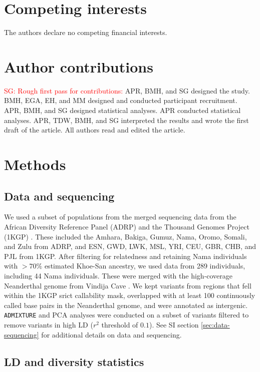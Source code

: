 \documentclass[]{article}
\newcommand{\sgcomment}[1]{{\textcolor{red}{SG: #1}}}
\begin{document}
\section*{Competing interests}
The authors declare no competing financial interests.

\section*{Author contributions}

\sgcomment{Rough first pass for contributions:}
APR, BMH, and SG designed the study. BMH, EGA, EH, and MM designed and conducted 
participant recruitment.   APR, BMH, and SG designed statistical analyses.
APR conducted statistical analyses. 
APR, TDW, BMH, and SG interpreted the results and wrote the first draft of the article. 
All authors read and edited the article.  

\section*{Methods}

\subsection*{Data and sequencing}

We used a subset of populations from the merged sequencing data from the
African Diversity Reference Panel (ADRP) \citep{Gurdasani2015-qy,Pagani2015-pz}
and the Thousand Genomes Project (1KGP)
\citep{1000_Genomes_Project_Consortium2015-zq}. These included the Amhara,
Bakiga, Gumuz, Nama, Oromo, Somali, and Zulu from ADRP, and ESN, GWD, LWK, MSL,
YRI, CEU, GBR, CHB, and PJL from 1KGP. After filtering for relatedness and
retaining Nama individuals with $>70\%$ estimated Khoe-San ancestry, we used
data from 289 individuals, including 44 Nama individuals. These were merged
with the high-coverage Neanderthal genome from Vindija Cave
\citep{Prufer2017-kk}. We kept variants from regions that fell within the 1KGP
srict callability mask, overlapped with at least 100 continuously called base
pairs in the Neanderthal genome, and were annotated as intergenic.
\texttt{ADMIXTURE} and PCA analyses were conducted on a subset of variants
filtered to remove variants in high LD ($r^2$ threshold of $0.1$). See SI
section \ref{sec:data-sequencing} for additional details on data and
sequencing.

\subsection*{LD and diversity statistics}
\end{document}
